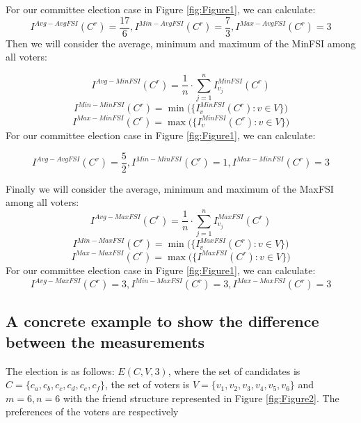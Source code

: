 \documentclass{article}
\begin{document}
For our committee election case in Figure   \ref{fig:Figure1}, we can calculate:
\begin{equation*}
 I^{Avg-AvgFSI}(C^{r}) = \frac{17}{6},  I^{Min-AvgFSI}(C^{r}) = \frac{7}{3},  I^{Max-AvgFSI}(C^{r}) = 3
 \end{equation*}
Then we will consider the average, minimum and maximum of the MinFSI among all voters:

\begin{equation}
     I^{Avg-MinFSI}(C^{r}) = \frac{1}{n}\cdot \sum_{j=1}^{n} I_{v_j}^{MinFSI}(C^{r})
\end{equation}
\begin{equation}
     I^{Min-MinFSI}(C^{r}) = \min \big ( \{I_{v}^{MinFSI}(C^{r}): v \in V\}  \big) 
\end{equation}
\begin{equation}
     I^{Max-MinFSI}(C^{r}) = \max \big ( \{I_{v}^{MinFSI}(C^{r}): v \in V\}  \big) 
\end{equation}
For our committee election case in Figure   \ref{fig:Figure1}, we can calculate:

\begin{equation*}
 I^{Avg-AvgFSI}(C^{r}) = \frac{5}{2}, I^{Min-MinFSI}(C^{r}) = 1,  I^{Max-MinFSI}(C^{r}) = 3
 \end{equation*}

Finally we will consider the average, minimum and maximum of the MaxFSI among all voters:
\begin{equation}
     I^{Avg-MaxFSI}(C^{r}) = \frac{1}{n}\cdot \sum_{j=1}^{n} I_{v_j}^{MaxFSI}(C^{r})
\end{equation}
\begin{equation}
     I^{Min-MaxFSI}(C^{r}) = \min \big ( \{I_{v}^{MaxFSI}(C^{r}): v \in V\}  \big) 
\end{equation}
\begin{equation}
     I^{Max-MaxFSI}(C^{r}) = \max \big ( \{I^{MaxFSI}(C^{r}): v \in V\}  \big) 
\end{equation}For our committee election case in Figure   \ref{fig:Figure1}, we can calculate:\begin{equation*}
    I^{Avg-MaxFSI}(C^{r}) = 3, I^{Min-MaxFSI}(C^{r}) = 3, I^{Max-MaxFSI}(C^{r}) = 3
\end{equation*}

\subsection{A concrete example to show the difference between the measurements}
The election is as follows:  $E(C,V,3)$,  where the set of candidates is $ C = \{c_a,c_b,c_c,c_d,c_e,c_f\}$, the set of voters is $V = \{v_1,v_2,v_3,v_4,v_5,v_6\}$  and $ m = 6, n = 6$ with the friend structure represented in Figure \ref{fig:Figure2}.  The preferences of the voters are respectively
\end{document}

